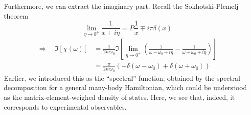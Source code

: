 Furthermore, we can extract the imaginary part. Recall the Sokhotski-Plemelj theorem
\[ \lim_{\eta \rightarrow 0^+} \frac{1}{x\pm i\eta}=P\frac{1}{x}\mp i\pi \delta \left( x \right) \]
\begin{align*}
    \Rightarrow \quad \Im \left[ \chi \left( \omega \right) \right] &=\frac{1}{2m\omega _0}\Im \left[ \lim_{\eta \rightarrow 0^+} \left( \frac{1}{\omega -\omega _0+i\eta}-\frac{1}{\omega +\omega _0+i\eta} \right) \right] \\
    &=\frac{\pi}{2m\omega _0}\left( -\delta \left( \omega -\omega _0 \right) +\delta \left( \omega +\omega _0 \right) \right)
\end{align*}
Earlier, we introduced this as the ``spectral'' function, obtained by the spectral decomposition for a general many-body Hamiltonian, which could be understood as the matrix-element-weighed density of states. Here, we see that, indeed, it corresponds to experimental observables.

